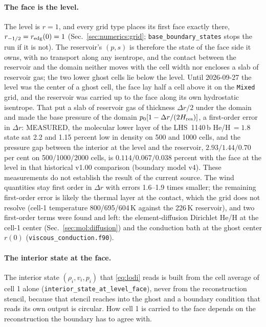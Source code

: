 \paragraph{The face is the level.}
The level is $r = 1$, and every grid type places its first face exactly
there, $r_{-1/2} = r_{\rm edg}(0) = 1$ (Sec.~\ref{sec:numerics:grid};
\texttt{base\_boundary\_states} stops the run if it is not).  The
reservoir's $(p, s)$ is therefore the state of the face side it owns, with no
transport along any isentrope, and the contact between the reservoir and the
domain neither moves with the cell width nor encloses a slab of reservoir
gas; the two lower ghost cells lie below the level.  Until 2026-09-27 the
level was the center of a ghost cell, the face lay half a cell above it on
the \texttt{Mixed} grid, and the reservoir was carried up to the face along
its own hydrostatic isentrope.  That put a slab of reservoir gas of thickness
$\Delta r/2$ under the domain and made the base pressure of the domain
$p_0[1-\Delta r/(2H_{\rm res})]$, a first-order error in $\Delta r$: MEASURED,
the molecular lower layer of the LHS~1140\,b He/H\,$=1.8$ state sat 2.2 and
1.15 percent low in density on 500 and 1000 cells, and the pressure gap
between the interior at the level and the reservoir, $2.93/1.44/0.70$ per
cent on 500/1000/2000 cells, is $0.114/0.067/0.038$ percent with the face at
the level in that historical v1.00 comparison (boundary model v4). These
measurements do not establish the result of the current source. The wind
quantities stay first order in $\Delta r$ with errors 1.6--1.9 times smaller;
the remaining first-order error is likely the thermal layer at the contact,
which the grid does not resolve (cell-1 temperature 800/695/604\,K against
the 226\,K reservoir), and two first-order terms were found and left: the
element-diffusion Dirichlet He/H at the cell-1 center
(Sec.~\ref{sec:mol:diffusion}) and the conduction bath at the ghost center
$r(0)$ (\texttt{viscous\_conduction.f90}).

\paragraph{The interior state at the face.}
The interior state $(\rho_i, v_i, p_i)$ that \eqref{eq:lodi} reads is built
from the cell average of cell 1 alone (\texttt{interior\_state\_at\_level\_face}),
never from the reconstruction stencil, because that stencil reaches into the
ghost and a boundary condition that reads its own output is circular.  How
cell 1 is carried to the face depends on the reconstruction the boundary
has to agree with.

